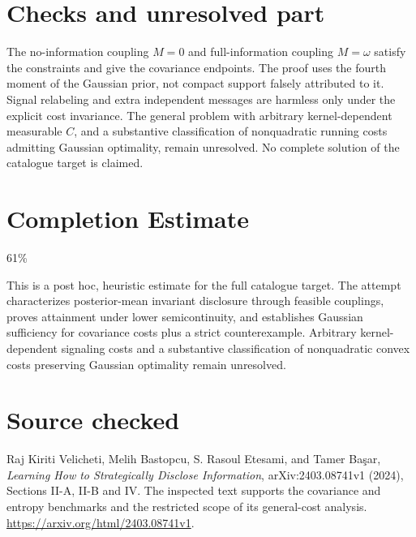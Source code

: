 \documentclass[11pt]{article}
\begin{document}
\section*{Checks and unresolved part}
The no-information coupling $M=0$ and full-information coupling $M=\omega$ satisfy the constraints and give the covariance endpoints. The proof uses the fourth moment of the Gaussian prior, not compact support falsely attributed to it. Signal relabeling and extra independent messages are harmless only under the explicit cost invariance. The general problem with arbitrary kernel-dependent measurable $C$, and a substantive classification of nonquadratic running costs admitting Gaussian optimality, remain unresolved. No complete solution of the catalogue target is claimed.

\section{Completion Estimate}
61\%

This is a post hoc, heuristic estimate for the full catalogue target.
The attempt characterizes posterior-mean invariant disclosure through feasible couplings, proves attainment under lower semicontinuity, and establishes Gaussian sufficiency for covariance costs plus a strict counterexample. Arbitrary kernel-dependent signaling costs and a substantive classification of nonquadratic convex costs preserving Gaussian optimality remain unresolved.

\section*{Source checked}
Raj Kiriti Velicheti, Melih Bastopcu, S. Rasoul Etesami, and Tamer Ba\c{s}ar, \emph{Learning How to Strategically Disclose Information}, arXiv:2403.08741v1 (2024), Sections II-A, II-B and IV. The inspected text supports the covariance and entropy benchmarks and the restricted scope of its general-cost analysis. \url{https://arxiv.org/html/2403.08741v1}.
\end{document}
